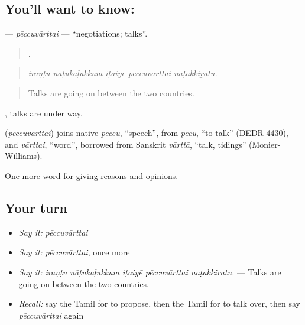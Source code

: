\subsection*{You'll want to know: }
\textbf{} — \emph{pēccuvārttai} — \textquotedblleft{}negotiations; talks\textquotedblright{}.

\begin{quote}
    .
\end{quote}

\begin{quote}
\emph{iraṇṭu nāṭukaḷukkum iṭaiyē pēccuvārttai naṭakkiṟatu.}
\end{quote}

\begin{quote}
Talks are going on between the two countries.
\end{quote}

 , talks are under way.

\begin{cousinweb}
\textbf{} (\emph{pēccuvārttai}) joins native \emph{pēccu}, \textquotedblleft{}speech\textquotedblright{}, from \emph{pēcu}, \textquotedblleft{}to talk\textquotedblright{} (DEDR 4430), and \emph{vārttai}, \textquotedblleft{}word\textquotedblright{}, borrowed from Sanskrit \emph{vārttā}, \textquotedblleft{}talk, tidings\textquotedblright{} (Monier-Williams).
\end{cousinweb}

\begin{grammarlens}[title={What you've built}]
One more word for giving reasons and opinions.
\end{grammarlens}

\subsection*{Your turn}
\begin{itemize}
\raggedright
  \item \emph{Say it:} \emph{pēccuvārttai}
  \item \emph{Say it:} \emph{pēccuvārttai}, once more
  \item \emph{Say it:} \emph{iraṇṭu nāṭukaḷukkum iṭaiyē pēccuvārttai naṭakkiṟatu.} — Talks are going on between the two countries.
  \item \emph{Recall:} say the Tamil for to propose, then the Tamil for to talk over, then say \emph{pēccuvārttai} again
\end{itemize}

